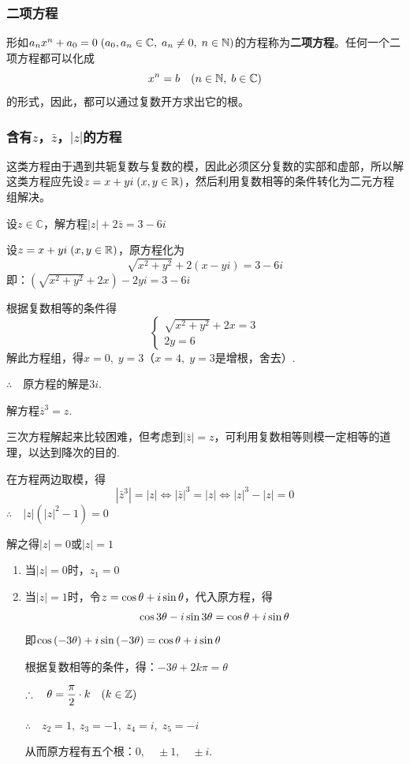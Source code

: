 \subsubsection{二项方程}
形如$a_nx^n+a_0=0\; (a_0,a_n\in\mathbb{C},\; a_n\ne 0,\; n\in\mathbb{N})$的方程称为\textbf{二项方程}。任何一个二项方程都可以化成
\[x^n=b\quad (n\in\mathbb{N},\; b\in\mathbb{C})\]
的形式，因此，都可以通过复数开方求出它的根。

\subsubsection{含有$z$，$\bar z$，$|z|$的方程}
这类方程由于遇到共轭复数与复数的模，因此必须区分复数的实部和虚部，所以解这类方程应先设$z=x+yi\; (x,y\in\mathbb{R})$，然后利用复数相等的条件转化为二元方程组解决。

\begin{example}
    设$z\in\mathbb{C}$，解方程$|z|+2\bar z=3-6i$
\end{example}

\begin{solution}
设$z=x+yi\; (x,y\in\mathbb{R})$，原方程化为
\[\sqrt{x^2+y^2}+2(x-yi)=3-6i\]
即：$\left(\sqrt{x^2+y^2}+2x\right)-2yi=3-6i$

根据复数相等的条件得
\[\begin{cases}
    \sqrt{x^2+y^2}+2x=3\\2y=6
\end{cases}\]
解此方程组，得$x=0,\; y=3$（$x=4,\; y=3$是增根，舍去）.

$\therefore\quad $原方程的解是$3i$.
\end{solution}

\begin{example}
    解方程$\bar z^3=z$.
\end{example}

\begin{analyze}
    三次方程解起来比较困难，但考虑到$|\bar z|=z$，可利用复数相等则模一定相等的道理，以达到降次的目的.
\end{analyze}

\begin{solution}
在方程两边取模，得
\[|\bar z^3|=|z|\Longleftrightarrow |\bar z|^3=|z|\Longleftrightarrow |z|^3-|z|=0\]
$\therefore\quad |z|\left(|z|^2-1\right)=0$

解之得$|z|=0$或$|z|=1$

\begin{enumerate}
    \item 当$|z|=0$时，$z_1=0$
    \item 当$|z|=1$时，令$z=\cos\theta+i\sin\theta$，代入原方程，得
\[\cos3\theta-i\sin3\theta=\cos\theta+i\sin\theta\]
即$\cos\left(-3\theta\right)+i\sin\left(-3\theta\right)=\cos\theta+i\sin\theta$

根据复数相等的条件，得：$-3\theta+2k\pi=\theta$

$\therefore\quad \theta=\dfrac{\pi}{2}\cdot k\quad (k\in\mathbb{Z})$

$\therefore\quad z_2=1,\; z_3=-1,\; z_4=i,\; z_5=-i$

从而原方程有五个根：$0,\quad \pm 1,\quad \pm i$.
\end{enumerate}
\end{solution}


